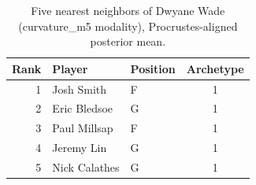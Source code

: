 \begin{table}[htbp]
  \centering\small
  \begin{tabular}{rllc}
    \toprule
    Rank & Player & Position & Archetype \\
    \midrule
    1 & Josh Smith & F & 1 \\
    2 & Eric Bledsoe & G & 1 \\
    3 & Paul Millsap & F & 1 \\
    4 & Jeremy Lin & G & 1 \\
    5 & Nick Calathes & G & 1 \\
    \bottomrule
  \end{tabular}
  \caption{Five nearest neighbors of Dwyane Wade (curvature_m5 modality), Procrustes-aligned posterior mean.}
  \label{tab:Dwyane_Wade_neighbors_curvature_m5}
\end{table}

